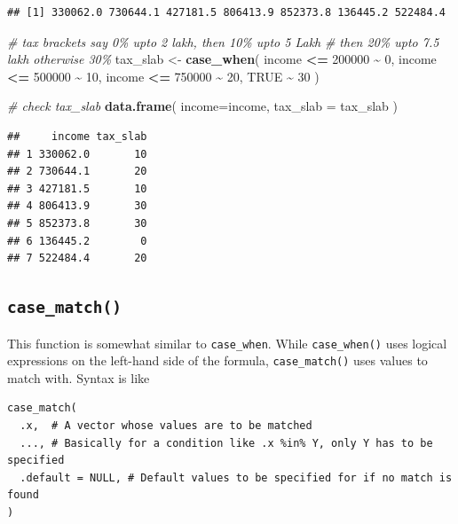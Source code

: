 \documentclass[
]{book}
\newenvironment{Shaded}{\begin{snugshade}}{\end{snugshade}}
\newcommand{\AttributeTok}[1]{\textcolor[rgb]{0.13,0.29,0.53}{#1}}
\newcommand{\CommentTok}[1]{\textcolor[rgb]{0.56,0.35,0.01}{\textit{#1}}}
\newcommand{\ConstantTok}[1]{\textcolor[rgb]{0.56,0.35,0.01}{#1}}
\newcommand{\DecValTok}[1]{\textcolor[rgb]{0.00,0.00,0.81}{#1}}
\newcommand{\FunctionTok}[1]{\textcolor[rgb]{0.13,0.29,0.53}{\textbf{#1}}}
\newcommand{\NormalTok}[1]{#1}
\newcommand{\OtherTok}[1]{\textcolor[rgb]{0.56,0.35,0.01}{#1}}
\newcommand{\SpecialCharTok}[1]{\textcolor[rgb]{0.81,0.36,0.00}{\textbf{#1}}}
\begin{document}
\begin{verbatim}
## [1] 330062.0 730644.1 427181.5 806413.9 852373.8 136445.2 522484.4
\end{verbatim}

\begin{Shaded}
\begin{Highlighting}[]
\CommentTok{\# tax brackets say 0\% upto 2 lakh, then 10\% upto 5 Lakh}
\CommentTok{\# then 20\% upto 7.5 lakh otherwise 30\%}
\NormalTok{tax\_slab }\OtherTok{\textless{}{-}} \FunctionTok{case\_when}\NormalTok{(}
\NormalTok{  income }\SpecialCharTok{\textless{}=} \DecValTok{200000} \SpecialCharTok{\textasciitilde{}} \DecValTok{0}\NormalTok{,}
\NormalTok{  income }\SpecialCharTok{\textless{}=} \DecValTok{500000} \SpecialCharTok{\textasciitilde{}} \DecValTok{10}\NormalTok{,}
\NormalTok{  income }\SpecialCharTok{\textless{}=} \DecValTok{750000} \SpecialCharTok{\textasciitilde{}} \DecValTok{20}\NormalTok{,}
  \ConstantTok{TRUE} \SpecialCharTok{\textasciitilde{}} \DecValTok{30}
\NormalTok{)}

\CommentTok{\# check tax\_slab}
\FunctionTok{data.frame}\NormalTok{(}
  \AttributeTok{income=}\NormalTok{income,}
  \AttributeTok{tax\_slab =}\NormalTok{ tax\_slab}
\NormalTok{)}
\end{Highlighting}
\end{Shaded}

\begin{verbatim}
##     income tax_slab
## 1 330062.0       10
## 2 730644.1       20
## 3 427181.5       10
## 4 806413.9       30
## 5 852373.8       30
## 6 136445.2        0
## 7 522484.4       20
\end{verbatim}

\hypertarget{case_match}{%
\subsection*{\texorpdfstring{\texttt{case\_match()}}{case\_match()}}\label{case_match}}

This function is somewhat similar to \texttt{case\_when}. While \texttt{case\_when()} uses logical expressions on the left-hand side of the formula, \texttt{case\_match()} uses values to match with. Syntax is like

\begin{verbatim}
case_match(
  .x,  # A vector whose values are to be matched
  ..., # Basically for a condition like .x %in% Y, only Y has to be specified
  .default = NULL, # Default values to be specified for if no match is found
)
\end{verbatim}
\end{document}
